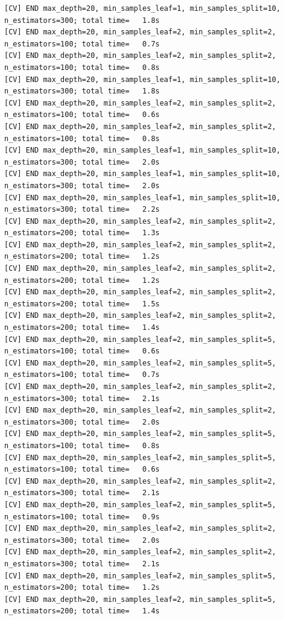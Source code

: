 \documentclass[
  11pt,
  letterpaper,
  DIV=11,
  numbers=noendperiod]{scrartcl}
\begin{document}
\begin{verbatim}
[CV] END max_depth=20, min_samples_leaf=1, min_samples_split=10, n_estimators=300; total time=   1.8s
[CV] END max_depth=20, min_samples_leaf=2, min_samples_split=2, n_estimators=100; total time=   0.7s
[CV] END max_depth=20, min_samples_leaf=2, min_samples_split=2, n_estimators=100; total time=   0.8s
[CV] END max_depth=20, min_samples_leaf=1, min_samples_split=10, n_estimators=300; total time=   1.8s
[CV] END max_depth=20, min_samples_leaf=2, min_samples_split=2, n_estimators=100; total time=   0.6s
[CV] END max_depth=20, min_samples_leaf=2, min_samples_split=2, n_estimators=100; total time=   0.8s
[CV] END max_depth=20, min_samples_leaf=1, min_samples_split=10, n_estimators=300; total time=   2.0s
[CV] END max_depth=20, min_samples_leaf=1, min_samples_split=10, n_estimators=300; total time=   2.0s
[CV] END max_depth=20, min_samples_leaf=1, min_samples_split=10, n_estimators=300; total time=   2.2s
[CV] END max_depth=20, min_samples_leaf=2, min_samples_split=2, n_estimators=200; total time=   1.3s
[CV] END max_depth=20, min_samples_leaf=2, min_samples_split=2, n_estimators=200; total time=   1.2s
[CV] END max_depth=20, min_samples_leaf=2, min_samples_split=2, n_estimators=200; total time=   1.2s
[CV] END max_depth=20, min_samples_leaf=2, min_samples_split=2, n_estimators=200; total time=   1.5s
[CV] END max_depth=20, min_samples_leaf=2, min_samples_split=2, n_estimators=200; total time=   1.4s
[CV] END max_depth=20, min_samples_leaf=2, min_samples_split=5, n_estimators=100; total time=   0.6s
[CV] END max_depth=20, min_samples_leaf=2, min_samples_split=5, n_estimators=100; total time=   0.7s
[CV] END max_depth=20, min_samples_leaf=2, min_samples_split=2, n_estimators=300; total time=   2.1s
[CV] END max_depth=20, min_samples_leaf=2, min_samples_split=2, n_estimators=300; total time=   2.0s
[CV] END max_depth=20, min_samples_leaf=2, min_samples_split=5, n_estimators=100; total time=   0.8s
[CV] END max_depth=20, min_samples_leaf=2, min_samples_split=5, n_estimators=100; total time=   0.6s
[CV] END max_depth=20, min_samples_leaf=2, min_samples_split=2, n_estimators=300; total time=   2.1s
[CV] END max_depth=20, min_samples_leaf=2, min_samples_split=5, n_estimators=100; total time=   0.9s
[CV] END max_depth=20, min_samples_leaf=2, min_samples_split=2, n_estimators=300; total time=   2.0s
[CV] END max_depth=20, min_samples_leaf=2, min_samples_split=2, n_estimators=300; total time=   2.1s
[CV] END max_depth=20, min_samples_leaf=2, min_samples_split=5, n_estimators=200; total time=   1.2s
[CV] END max_depth=20, min_samples_leaf=2, min_samples_split=5, n_estimators=200; total time=   1.4s

\end{verbatim}
\end{document}
